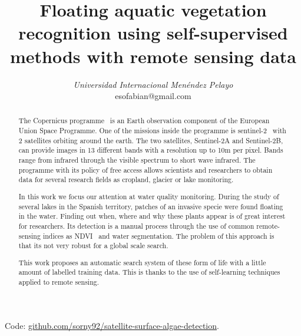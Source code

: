 \documentclass[conference]{IEEEtran}
\begin{document}
    \title{Floating aquatic vegetation recognition using self-supervised methods with remote sensing data}

    \author{
    \textit{Universidad Internacional Menéndez Pelayo}\\
    esofabian@gmail.com}

    \maketitle

    \begin{abstract}
        The Copernicus programme~\cite{whatiscopernicus} is an Earth observation component of the European Union Space
        Programme.
        One of the missions inside the programme is sentinel-2~\cite{sentinel-2} with 2 satellites orbiting around the
        earth.
        The two satellites, Sentinel-2A and Sentinel-2B, can provide images in 13 different bands with a resolution up
        to 10m per pixel.
        Bands range from infrared through the visible spectrum to short wave infrared.
        The programme with its policy of free access allows scientists and researchers to obtain data for several
        research fields as cropland, glacier or lake monitoring.

        In this work we focus our attention at water quality monitoring.
        During the study of several lakes in the Spanish territory, patches of an invasive specie were found floating in the water.
        Finding out when, where and why these plants appear is of great interest for researchers.
        Its detection is a manual process through the use of common remote-sensing indices as NDVI~\cite{NDVIsource}
        and water segmentation.
        The problem of this approach is that its not very robust for a global scale search.

        This work proposes an automatic search system of these form of life with a little amount of labelled training data.
        This is thanks to the use of self-learning techniques applied to remote sensing.
    \end{abstract}
    \newline
    Code: \href{https://github.com/sorny92/satellite-surface-algae-detection}{github.com/sorny92/satellite-surface-algae-detection}.
    \newline
\end{document}
